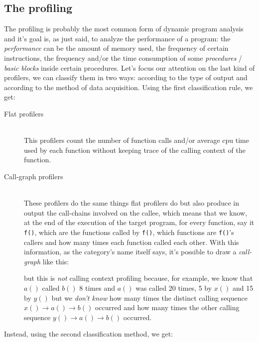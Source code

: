\documentclass[a4paper,11pt]{report}
\begin{document}
\subsection{The profiling}
The profiling is probably the most common form of dynamic program analysis and it's goal is, as just said, to analyze the performance of a program: the \emph{performance} can be the amount of memory used, the frequency of certain instructions, the frequency and/or the time consumption of some \emph{procedures} / \emph{basic blocks} inside certain procedures. Let's focus our attention on the last kind of profilers, we can classify them in two ways: according to the type of output and according to the method of data acquisition. Using the first classification rule, we get:

\begin{description}
\item[Flat profilers] \hfill \\
This profilers count the number of function calls and/or average cpu time used by each function without keeping trace of the calling context of the function.
\item[Call-graph profilers] \hfill \\
These profilers do the same things flat profilers do but also produce in output the call-chains involved on the callee, which means that we know, at the end of the execution of the target program, for every function, say it \verb|f()|, which are the functions called by \verb|f()|, which functions are \verb|f()|'s callers and how many times each function called each other. With this information, as the category's name itself says, it's possible to draw a \emph{call-graph} like this:


but this is \emph{not} calling context profiling because, for example, we know that $a()$ called $b()$ 8 times and $a()$ was called 20 times, 5 by $x()$ and 15 by $y()$ but we \emph{don't know} how many times the distinct calling sequence 
$x()\rightarrow a()\rightarrow b()$ occurred and how many times the other calling sequence $y()\rightarrow a()\rightarrow b()$ occurred.

\end{description}

\begin{flushleft}
Instead, using the second classification method, we get:
\end{flushleft}
\end{document}
